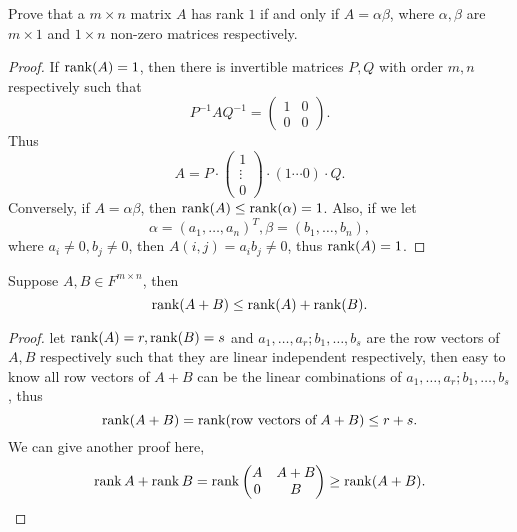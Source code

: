 \begin{pro}%
	Prove that a $m\times n$ matrix $A$ has rank $1$ if and only if $A=\alpha\beta$, where $\alpha,\beta$ are $m\times 1$ and $1\times n$ non-zero matrices respectively.
\end{pro}
\begin{proof}
	If $\operatorname*{rank}(A)=1$, then there is invertible matrices $P,Q$ with order $m,n$ respectively such that
	\[P^{-1}AQ^{-1}=\begin{pmatrix}1 & 0\\ 0 & 0\end{pmatrix}.\]
	Thus
	\[A=P\cdot \begin{pmatrix} 1\\ \vdots\\0\end{pmatrix}\cdot (1\cdots 0)\cdot Q.\]
	Conversely, if $A=\alpha\beta$, then $\operatorname*{rank}(A)\leq \operatorname*{rank}(\alpha)=1$. Also, if we let
	\[\alpha=(a_1,\dots,a_n)^T,\beta=(b_1,\dots,b_n),\]
	where $a_i\neq 0,b_j\neq 0$, then $A(i,j)=a_ib_j\neq 0$, thus $\operatorname*{rank}(A)=1$.
\end{proof}

\begin{pro}%
	Suppose $A,B\in F^{m\times n}$, then
	\[\operatorname*{rank}(A+B)\leq \operatorname*{rank}(A)+\operatorname*{rank}(B).\]
\end{pro}
\begin{proof}
	let $\operatorname*{rank}(A)=r,\operatorname*{rank}(B)=s$ and $a_1,\dots,a_r;b_1,\dots,b_s$ are the row vectors of $A, B$ respectively such that they are linear independent respectively, then easy to know all row vectors of $A+B$ can be the linear combinations of $a_1,\dots,a_r;b_1,\dots,b_s$, thus
	\[\operatorname*{rank}(A+B)=\operatorname*{rank}(\mbox{row vectors of}\;A+B)\leq r+s.\]
	We can give another proof here,
	\[\operatorname*{rank} A+\operatorname*{rank} B=\operatorname*{rank}\begin{pmatrix} A & A+B\\0 & B\end{pmatrix}\geq \operatorname*{rank}(A+B).\]
\end{proof}

